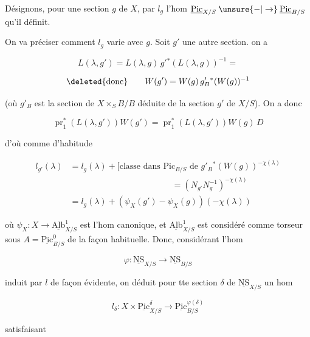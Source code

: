Désignons, pour une section $g$ de $X$, par $l_g$ l'hom $\underline{\mathrm{Pic}}_{X/S}\mathbin{\unsure{-|\to}}\underline{\mathrm{Pic}}_{B/S}$ qu'il définit.

On va préciser comment $l_g$ varie avec $g$. Soit $g'$ une autre section.  on a

\[
L(\lambda,g')=L(\lambda,g)\,g'{}^{*}(L(\lambda,g))^{-1}=
\]

\[
\text{\deleted{donc}}\qquad W(g')=W(g)\,g'_B{}^*(W(g))^{-1}
\]

(où $g'_B$ est la section de $X\times_S B/B$ déduite de la section $g'$ de $X/S$). On a donc

\[
\operatorname{pr}_1^{*}(L(\lambda,g'))W(g')=\operatorname{pr}_1^{*}(L(\lambda,g'))W(g)\,D
\]


d'où comme d'habitude

\[
\begin{aligned}l_{g'}(\lambda)&=l_g(\lambda)+\bigl[\text{classe dans }\mathrm{Pic}_{B/S}\text{ de }g'_B{}^{*}(W(g))^{-\chi(\lambda)}\\ &\hspace{12em}=(N_{g'}N_g^{-1})^{-\chi(\lambda)}\\ &=l_g(\lambda)+(\psi_X(g')-\psi_X(g))(-\chi(\lambda))\end{aligned}\tag*{(*)}
\]

où $\psi_X\colon X\longrightarrow\underline{\mathrm{Alb}}^1_{X/S}$ est l'hom canonique, et $\underline{\mathrm{Alb}}^1_{X/S}$ est considéré comme torseur sous $A=\underline{\mathrm{Pic}}^0_{B/S}$ de la façon habituelle. Donc, considérant l'hom

\[
\varphi\colon\underline{\mathrm{NS}}_{X/S}\longrightarrow\underline{\mathrm{NS}}_{B/S}
\]

induit par $l$ de façon évidente, on déduit pour tte section $\delta$ de $\underline{\mathrm{NS}}_{X/S}$ un hom

\[
\boxed{l_\delta\colon X\times\underline{\mathrm{Pic}}^\delta_{X/S}\longrightarrow\underline{\mathrm{Pic}}^{\varphi(\delta)}_{B/S}}
\]

  satisfaisant 

